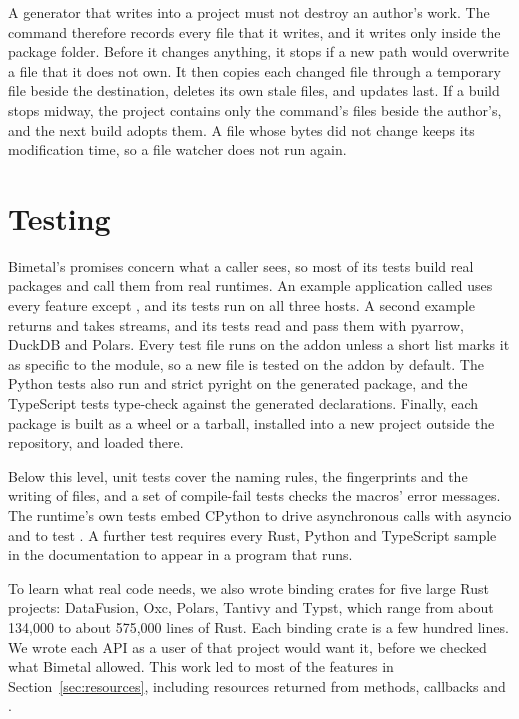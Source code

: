 \documentclass[sigconf,nonacm]{acmart}
\begin{document}
A generator that writes into a project must not destroy an author's work. The command therefore records every file that it writes, and it writes only inside the package folder. Before it changes anything, it stops if a new path would overwrite a file that it does not own. It then copies each changed file through a temporary file beside the destination, deletes its own stale files, and updates  last. If a build stops midway, the project contains only the command's files beside the author's, and the next build adopts them. A file whose bytes did not change keeps its modification time, so a file watcher does not run again.

\section{Testing}
\label{sec:testing}

Bimetal's promises concern what a caller sees, so most of its tests build real packages and call them from real runtimes. An example application called  uses every feature except , and its tests run on all three hosts. A second example returns and takes streams, and its tests read and pass them with pyarrow, DuckDB and Polars. Every test file runs on the addon unless a short list marks it as specific to the module, so a new file is tested on the addon by default. The Python tests also run  and strict pyright on the generated package, and the TypeScript tests type-check against the generated declarations. Finally, each package is built as a wheel or a tarball, installed into a new project outside the repository, and loaded there.

Below this level, unit tests cover the naming rules, the fingerprints and the writing of files, and a set of compile-fail tests checks the macros' error messages. The runtime's own tests embed CPython to drive asynchronous calls with asyncio and to test . A further test requires every Rust, Python and TypeScript sample in the documentation to appear in a program that runs.

To learn what real code needs, we also wrote binding crates for five large Rust projects: DataFusion, Oxc, Polars, Tantivy and Typst, which range from about 134,000 to about 575,000 lines of Rust. Each binding crate is a few hundred lines. We wrote each API as a user of that project would want it, before we checked what Bimetal allowed. This work led to most of the features in Section~\ref{sec:resources}, including resources returned from methods, callbacks and .
\end{document}
